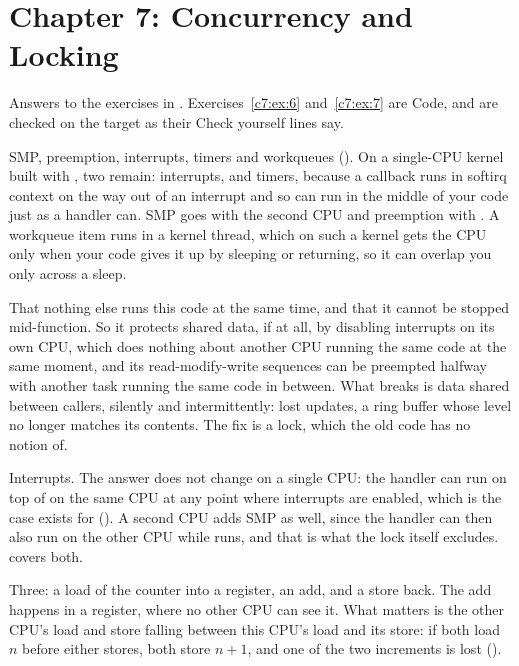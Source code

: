 
\section{Chapter 7: Concurrency and Locking}
\label{sol:sec:c7}
Answers to the exercises in . Exercises~\ref{c7:ex:6} and~\ref{c7:ex:7}
are Code, and are checked on the target as their Check yourself lines say.


 SMP, preemption, interrupts, timers and workqueues (). On a single-CPU
kernel built with , two remain: interrupts, and timers, because a
 callback runs in softirq context on the way out of an interrupt and so can run in
the middle of your code just as a handler can. SMP goes with the second CPU and preemption with
. A workqueue item runs in a kernel thread, which on such a kernel gets the CPU
only when your code gives it up by sleeping or returning, so it can overlap you only across a sleep.

 That nothing else runs this code at the same time, and that it cannot be stopped
mid-function. So it protects shared data, if at all, by disabling interrupts on its own CPU, which
does nothing about another CPU running the same code at the same moment, and its read-modify-write
sequences can be preempted halfway with another task running the same code in between. What breaks
is data shared between callers, silently and intermittently: lost updates, a ring buffer whose level
no longer matches its contents. The fix is a lock, which the old code has no notion of.

 Interrupts. The answer does not change on a single CPU: the handler can run on top of
 on the same CPU at any point where interrupts are enabled, which is the case
 exists for (). A second CPU adds SMP as well, since the
handler can then also run on the other CPU while  runs, and that is what the lock
itself excludes.  covers both.

 Three: a load of the counter into a register, an add, and a store back. The add happens in
a register, where no other CPU can see it. What matters is the other CPU's load and store falling
between this CPU's load and its store: if both load $n$ before either stores, both store $n+1$, and
one of the two increments is lost ().

